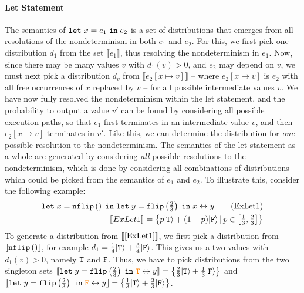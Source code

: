 \paragraph{Let Statement}
The semantics of $\texttt{let}\; x=e_1 \;\texttt{in}\; e_2$ is a set of distributions that emerges from all resolutions of the nondeterminism in both $e_1$ and $e_2$.
For this, we first pick one distribution $d_1$ from the set $\llbracket e_1 \rrbracket$, thus resolving the nondeterminism in $e_1$.
Now, since there may be many values $v$ with $d_1(v) > 0$, and $e_2$ may depend on $v$, we must next pick a distribution $d_v$ from $\llbracket e_2 [x\mapsto v]\rrbracket$ -- where $e_2 [x\mapsto v]$ is $e_2$ with all free occurrences of $x$ replaced by $v$ -- for all possible intermediate values $v$.
We have now fully resolved the nondeterminism within the let statement, and the probability to output a value $v'$ can be found by considering all possible execution paths, so that $e_1$ first terminates in an intermediate value $v$, and then $e_2[x\mapsto v]$ terminates in $v'$.
Like this, we can determine the distribution for \textit{one} possible resolution to the nondeterminism. 
The semantics of the let-statement as a whole are generated by considering \textit{all} possible resolutions to the nondeterminism, which is done by considering all combinations of distributions which could be picked from the semantics of $e_1$ and $e_2$.
To illustrate this, consider the following example:
\begin{align*}
	\texttt{let}\; x = \texttt{nflip}\left(\right)  \;\texttt{in}\; \texttt{let}\; y = \texttt{flip} \left(\tfrac{2}{3}\right)  \;\texttt{in}\; x \leftrightarrow y \tag{ExLet1}\label{ExLet1}\\
	\llbracket ExLet1 \rrbracket = \left\{p | \texttt{T} \rangle + (1-p)| \texttt{F} \rangle \,|\, p \in \left[\tfrac{1}{3},\tfrac{2}{3}\right]\right\}
\end{align*}
To generate a distribution from $\llbracket \text{\ref{ExLet1}} \rrbracket$, we first pick a distribution from $\llbracket \texttt{nflip}\left(\right)  \rrbracket$, for example $d_1 = \frac{1}{4}|\texttt{T}\rangle + \frac{3}{4}|\texttt{F}\rangle$.
This gives us a two values with $d_1(v) > 0$, namely $\texttt{T}$ and $\texttt{F}$.  
Thus, we have to pick distributions from the two singleton sets $\llbracket \texttt{let}\; y = \texttt{flip} \left(\tfrac{2}{3}\right)  \;\texttt{in}\; {\color{orange}\texttt{T}} \leftrightarrow y \rrbracket = \left\{\frac{2}{3}|\texttt{T}\rangle + \frac{1}{3}|\texttt{F}\rangle\right\}$ and $\llbracket \texttt{let}\; y = \texttt{flip} \left(\tfrac{2}{3}\right)  \;\texttt{in}\; { \color{orange} \texttt{F}} \leftrightarrow y \rrbracket = \left\{\frac{1}{3}|\texttt{T}\rangle + \frac{2}{3}|\texttt{F}\rangle\right\}$.
